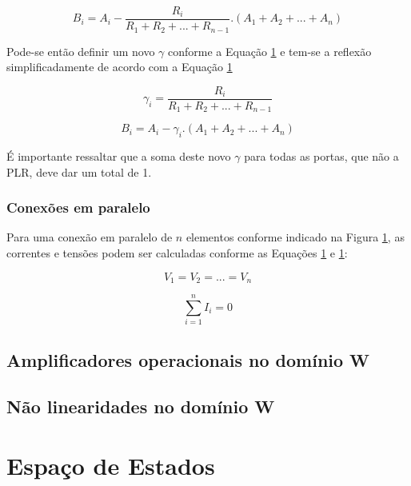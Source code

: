 	\begin{equation}
		B_i = A_i - \frac{R_i}{R_1+R_2+...+R_{n-1}}.(A_1+A_2+...+A_n)
	\end{equation}
	
	Pode-se então definir um novo $\gamma$ conforme a Equação \ref{} e tem-se a  reflexão simplificadamente de acordo com a Equação \ref{}
	
	\begin{equation}
		\gamma_i = \frac{R_i}{R_1+R_2+...+R_{n-1}}
	\end{equation} 
	
	\begin{equation}
		B_i = A_i - \gamma_i.(A_1+A_2+...+A_n)
	\end{equation}

	É importante ressaltar que a soma deste novo $\gamma$ para todas as portas, que não a PLR, deve dar um total de 1.
	
		\subsubsection{Conexões em paralelo}
	
	Para uma conexão em paralelo de $n$ elementos conforme indicado na Figura \ref{}, as correntes e tensões podem ser calculadas conforme as Equações \ref{} e \ref{}:
	
	\begin{equation}
		V_1 = V_2 = ... = V_n
	\end{equation}
	
	\begin{equation}
		\sum_{i=1}^{n} I_i = 0
	\end{equation}
	
	
	\subsection{Amplificadores operacionais no domínio W}
	\subsection{Não linearidades no domínio W}
	
	\section{Espaço de Estados}

